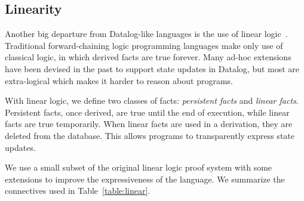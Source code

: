 \subsection{Linearity}

Another big departure from Datalog-like languages is the use of linear logic~\cite{Girard95logic:its}. Traditional forward-chaining logic programming languages make only use of classical logic, in which derived facts are true forever. Many ad-hoc extensions~\cite{Liu98extendingdatalog,Ludascher95alogical} have been devised in the past to support state updates in Datalog, but most are extra-logical which makes it harder to reason about programs.

With linear logic, we define two classes of facts: \emph{persistent facts} and \emph{linear facts}. Persistent facts, once derived, are true until the end of execution, while linear facts are true temporarily. When linear facts are used in a derivation, they are deleted from the database. This allows programs to transparently express state updates.

We use a small subset of the original linear logic proof system with some extensions to improve
the expressiveness of the language. We summarize the connectives used in Table~\ref{table:linear}.

\begin{table}
   \begin{center}
\end{center}
\caption{Connectives from Linear Logic used in \lang.}
\label{table:linear}
\end{table}

